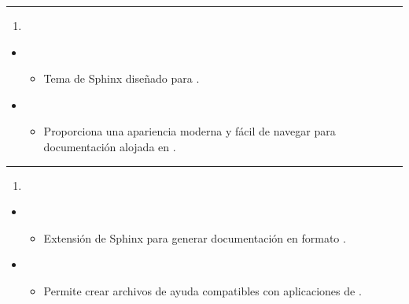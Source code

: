\documentclass[a4paper,10pt,spanish]{sphinxmanual}
\begin{document}
\bigskip\hrule\bigskip

\begin{enumerate}
%
\setcounter{enumi}{30}
\item {} 
\sphinxAtStartPar
{}

\end{enumerate}
\begin{itemize}
\item {} 
\sphinxAtStartPar
{}
\begin{itemize}
\item {} 
\sphinxAtStartPar
Tema de Sphinx diseñado para .

\end{itemize}

\item {} 
\sphinxAtStartPar
{}
\begin{itemize}
\item {} 
\sphinxAtStartPar
Proporciona una apariencia moderna y fácil de navegar para documentación alojada en .

\end{itemize}

\end{itemize}


\bigskip\hrule\bigskip

\begin{enumerate}
%
\setcounter{enumi}{31}
\item {} 
\sphinxAtStartPar
{}

\end{enumerate}
\begin{itemize}
\item {} 
\sphinxAtStartPar
{}
\begin{itemize}
\item {} 
\sphinxAtStartPar
Extensión de Sphinx para generar documentación en formato .

\end{itemize}

\item {} 
\sphinxAtStartPar
{}
\begin{itemize}
\item {} 
\sphinxAtStartPar
Permite crear archivos de ayuda compatibles con aplicaciones de .

\end{itemize}

\end{itemize}
\end{document}
